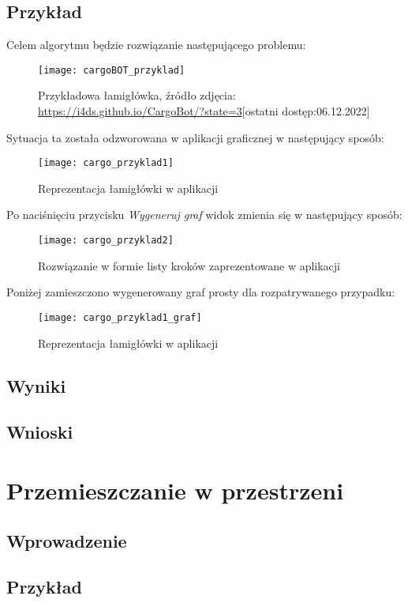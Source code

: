     \subsection{Przykład}  
    Celem algorytmu będzie rozwiązanie następującego problemu:
    \begin{figure}[H]
        \label{CargoObrazek}
        \texttt{[image: cargoBOT\_przyklad]}
        \centering
        \caption{Przykładowa łamigłówka, źródło zdjęcia: \url{https://i4ds.github.io/CargoBot/?state=3}[ostatni dostęp:06.12.2022]}
    \end{figure}
    Sytuacja ta została odzworowana w aplikacji graficznej w następujący sposób:
    \begin{figure}[H]
        \label{CargoObrazek}
        \texttt{[image: cargo\_przyklad1]}
        \centering
        \caption{Reprezentacja łamigłówki w aplikacji}
    \end{figure}
    Po naciśnięciu przycisku \textit{Wygeneruj graf} widok zmienia się w następujący sposób:
    \begin{figure}[H]
        \label{CargoObrazek}
        \texttt{[image: cargo\_przyklad2]}
        \centering
        \caption{Rozwiązanie w formie listy kroków zaprezentowane w aplikacji}
    \end{figure}
    Poniżej zamieszczono wygenerowany graf prosty dla rozpatrywanego przypadku:
    \begin{figure}[H]
        \label{CargoObrazek}
        \texttt{[image: cargo\_przyklad1\_graf]}
        \centering
        \caption{Reprezentacja łamigłówki w aplikacji}
    \end{figure}
    \subsection{Wyniki}
    \subsection{Wnioski}
\section{Przemieszczanie w przestrzeni}
    \subsection{Wprowadzenie}
    \subsection{Przykład}
